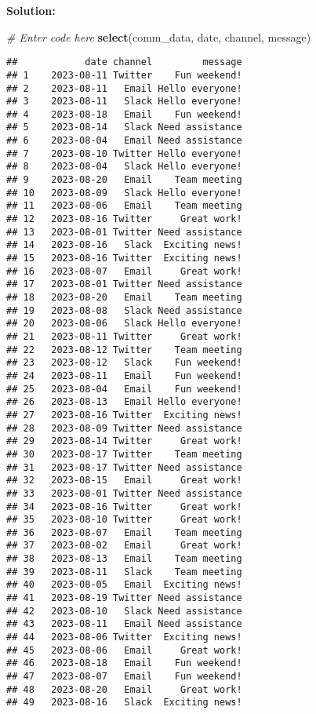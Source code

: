 \documentclass[
]{article}
\newenvironment{Shaded}{\begin{snugshade}}{\end{snugshade}}
\newcommand{\CommentTok}[1]{\textcolor[rgb]{0.56,0.35,0.01}{\textit{#1}}}
\newcommand{\FunctionTok}[1]{\textcolor[rgb]{0.13,0.29,0.53}{\textbf{#1}}}
\newcommand{\NormalTok}[1]{#1}
\begin{document}
\textbf{Solution:}

\begin{Shaded}
\begin{Highlighting}[]
\CommentTok{\# Enter code here}
\FunctionTok{select}\NormalTok{(comm\_data, date, channel, message)}
\end{Highlighting}
\end{Shaded}

\begin{verbatim}
##            date channel         message
## 1    2023-08-11 Twitter    Fun weekend!
## 2    2023-08-11   Email Hello everyone!
## 3    2023-08-11   Slack Hello everyone!
## 4    2023-08-18   Email    Fun weekend!
## 5    2023-08-14   Slack Need assistance
## 6    2023-08-04   Email Need assistance
## 7    2023-08-10 Twitter Hello everyone!
## 8    2023-08-04   Slack Hello everyone!
## 9    2023-08-20   Email    Team meeting
## 10   2023-08-09   Slack Hello everyone!
## 11   2023-08-06   Email    Team meeting
## 12   2023-08-16 Twitter     Great work!
## 13   2023-08-01 Twitter Need assistance
## 14   2023-08-16   Slack  Exciting news!
## 15   2023-08-16 Twitter  Exciting news!
## 16   2023-08-07   Email     Great work!
## 17   2023-08-01 Twitter Need assistance
## 18   2023-08-20   Email    Team meeting
## 19   2023-08-08   Slack Need assistance
## 20   2023-08-06   Slack Hello everyone!
## 21   2023-08-11 Twitter     Great work!
## 22   2023-08-12 Twitter    Team meeting
## 23   2023-08-12   Slack    Fun weekend!
## 24   2023-08-11   Email    Fun weekend!
## 25   2023-08-04   Email    Fun weekend!
## 26   2023-08-13   Email Hello everyone!
## 27   2023-08-16 Twitter  Exciting news!
## 28   2023-08-09 Twitter Need assistance
## 29   2023-08-14 Twitter     Great work!
## 30   2023-08-17 Twitter    Team meeting
## 31   2023-08-17 Twitter Need assistance
## 32   2023-08-15   Email     Great work!
## 33   2023-08-01 Twitter Need assistance
## 34   2023-08-16 Twitter     Great work!
## 35   2023-08-10 Twitter     Great work!
## 36   2023-08-07   Email    Team meeting
## 37   2023-08-02   Email     Great work!
## 38   2023-08-13   Email    Team meeting
## 39   2023-08-11   Slack    Team meeting
## 40   2023-08-05   Email  Exciting news!
## 41   2023-08-19 Twitter Need assistance
## 42   2023-08-10   Slack Need assistance
## 43   2023-08-11   Email Need assistance
## 44   2023-08-06 Twitter  Exciting news!
## 45   2023-08-06   Email     Great work!
## 46   2023-08-18   Email    Fun weekend!
## 47   2023-08-07   Email    Fun weekend!
## 48   2023-08-20   Email     Great work!
## 49   2023-08-16   Slack  Exciting news!

\end{verbatim}
\end{document}
